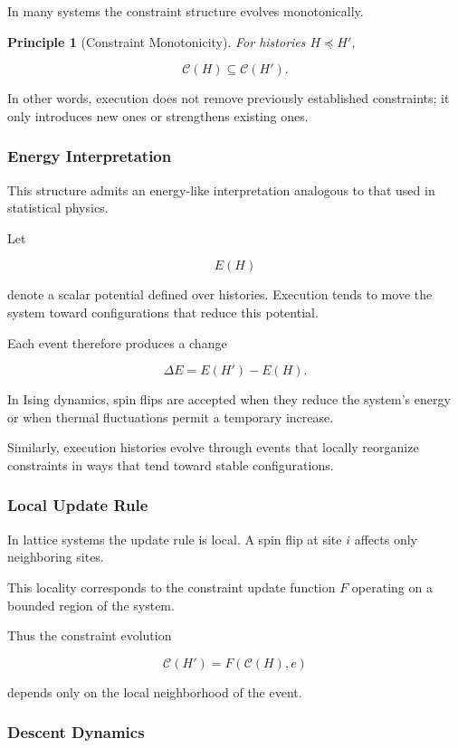 \documentclass[12pt]{article}
\newtheorem{principle}{Principle}
\begin{document}
In many systems the constraint structure evolves monotonically.

\begin{principle}[Constraint Monotonicity]
For histories $H \preceq H'$,

\[
\mathcal{C}(H) \subseteq \mathcal{C}(H').
\]
\end{principle}

In other words, execution does not remove previously
established constraints; it only introduces new ones
or strengthens existing ones.

\subsubsection{Energy Interpretation}

This structure admits an energy-like interpretation
analogous to that used in statistical physics.

Let

\[
E(H)
\]

denote a scalar potential defined over histories.
Execution tends to move the system toward configurations
that reduce this potential.

Each event therefore produces a change

\[
\Delta E = E(H') - E(H).
\]

In Ising dynamics, spin flips are accepted when they
reduce the system's energy or when thermal fluctuations
permit a temporary increase.

Similarly, execution histories evolve through events
that locally reorganize constraints in ways that tend
toward stable configurations.

\subsubsection{Local Update Rule}

In lattice systems the update rule is local.
A spin flip at site $i$ affects only neighboring
sites.

This locality corresponds to the constraint update
function $F$ operating on a bounded region of the
system.

Thus the constraint evolution

\[
\mathcal{C}(H') = F(\mathcal{C}(H), e)
\]

depends only on the local neighborhood of the event.

\subsubsection{Descent Dynamics}
\end{document}
